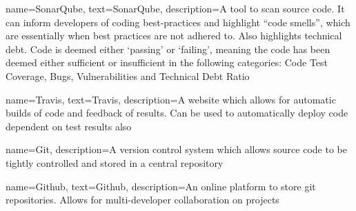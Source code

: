 {
    name={SonarQube},
    text={SonarQube},
    description={A tool to scan source code. It can inform developers of coding best-practices and highlight ``code smells'', which are essentially when best practices are not adhered to. Also highlights technical debt. Code is deemed either `passing' or `failing', meaning the code has been deemed either sufficient or insufficient in the following categories: Code Test Coverage, Bugs, Vulnerabilities and Technical Debt Ratio}
}

{
    name={Travis},
    text={Travis},
    description={A website which allows for automatic builds of code and feedback of results. Can be used to automatically deploy code dependent on test results also}
}

{
    name={Git},
    description={A version control system which allows source code to be tightly controlled and stored in a central repository}
}

{
    name={Github},
    text={Github},
    description={An online platform to store git repositories. Allows for multi-developer collaboration on projects}
}

